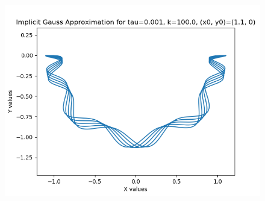 \documentclass{article}
\theoremstyle{definition}
\begin{document}
\begin{itemize}
\begin{figure}[H]
			\includegraphics[scale=0.6]{gauss_spring_0001_100}
		\end{figure}


\end{itemize}
\end{document}
